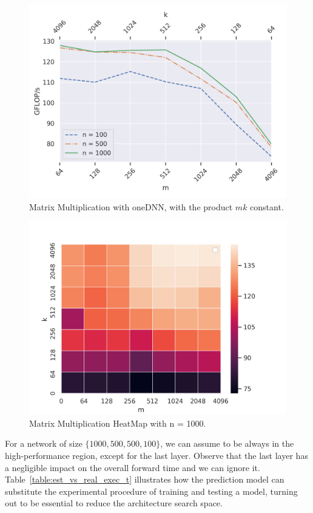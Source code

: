 \begin{figure}
	\centering
	\includegraphics[width=0.8\columnwidth]{imgs/DNNL_different_N_reverse.png}
	\caption{Matrix Multiplication with oneDNN, with the product $mk$ constant. }
	
	\label{fig:onednnl_rev}
\end{figure}

\begin{figure}
	\centering
	\includegraphics[width=\columnwidth]{imgs/heatmap_gflops_batch1000.png}
	\caption{Matrix Multiplication HeatMap with n = 1000.}
	\label{fig:heatmap}
\end{figure}


For a network of size $\{1000, 500, 500, 100 \}$, we can assume to be always in the high-performance region, except for the last layer. Observe that the last layer has a negligible impact on the overall forward time and we can ignore it. Table~\ref{table:est_vs_real_exec_t} illustrates how the prediction model can substitute the experimental procedure of training and testing a model, turning out to be essential to reduce the architecture search space.

